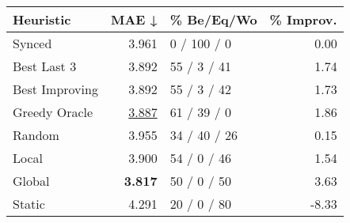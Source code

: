 \begin{tabular}{lrlr}
\toprule
\textbf{Heuristic} & \textbf{MAE ↓} & \textbf{\% Be/Eq/Wo} & \textbf{\% Improv.} \\
\midrule
            Synced &          3.961 &          0 / 100 / 0 &                0.00 \\
\midrule
       Best Last 3 &          3.892 &          55 / 3 / 41 &                1.74 \\
    Best Improving &          3.892 &          55 / 3 / 42 &                1.73 \\
\addlinespace
     Greedy Oracle &          \underline{3.887} &          61 / 39 / 0 &                1.86 \\
            Random &          3.955 &         34 / 40 / 26 &                0.15 \\
\midrule
             Local &          3.900 &          54 / 0 / 46 &                1.54 \\
            Global &          \textbf{3.817} &          50 / 0 / 50 &                3.63 \\
\midrule
            Static &          4.291 &          20 / 0 / 80 &               -8.33 \\
\bottomrule
\end{tabular}

\label{tab:ds_iid_lr01_le1_bs2_Summary}
